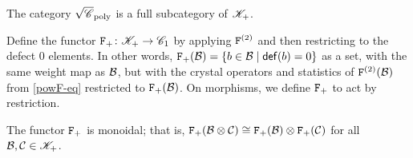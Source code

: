 \documentclass[11pt]{article}
\begin{document}
\begin{corollary}
The category $\sqrt{\sC}_{\poly}$ is a full subcategory of $\sK_+$. 
\end{corollary}

Define the functor $\defectF{2} \colon \sK_+ \to \sC_1$ by applying $\powF{2}$ and then restricting to the defect $0$ elements.
In other words, $\defectF{2}(\cB)= \{b \in \cB \mid \defect(b) = 0 \}$ as a set, with the same weight map as $\cB$, but with the crystal operators and statistics of $\powF{2}(\cB)$ from \eqref{powF-eq} restricted to $\defectF{2}(\cB)$.
On morphisms, we define $\defectF{2}$ to act by restriction.


\begin{proposition}
\label{defectF-prop}
The functor $\defectF{2}$ is monoidal; that is, $\defectF{2}(\cB \otimes \cC) \iso \defectF{2}(\cB) \otimes \defectF{2}(\cC)$ for all $\cB,\cC\in \sK_+$.
\end{proposition}
\end{document}
